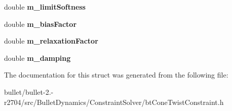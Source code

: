 \begin{DoxyCompactItemize}
\item 
\hypertarget{structbt_cone_twist_constraint_double_data_aac503a53cbc51bdc811d00b069204ce7}{double {\bfseries m\+\_\+limit\+Softness}}\label{structbt_cone_twist_constraint_double_data_aac503a53cbc51bdc811d00b069204ce7}

\item 
\hypertarget{structbt_cone_twist_constraint_double_data_a652d206046bfacc0f093b4551b9f2ff3}{double {\bfseries m\+\_\+bias\+Factor}}\label{structbt_cone_twist_constraint_double_data_a652d206046bfacc0f093b4551b9f2ff3}

\item 
\hypertarget{structbt_cone_twist_constraint_double_data_ad3a740156d2dff51a10564c5aa7d44a6}{double {\bfseries m\+\_\+relaxation\+Factor}}\label{structbt_cone_twist_constraint_double_data_ad3a740156d2dff51a10564c5aa7d44a6}

\item 
\hypertarget{structbt_cone_twist_constraint_double_data_a602d893f0fb62617989895db260a2b8c}{double {\bfseries m\+\_\+damping}}\label{structbt_cone_twist_constraint_double_data_a602d893f0fb62617989895db260a2b8c}

\end{DoxyCompactItemize}


The documentation for this struct was generated from the following file\+:\begin{DoxyCompactItemize}
\item 
bullet/bullet-\/2.-\/r2704/src/\+Bullet\+Dynamics/\+Constraint\+Solver/bt\+Cone\+Twist\+Constraint.\+h\end{DoxyCompactItemize}
